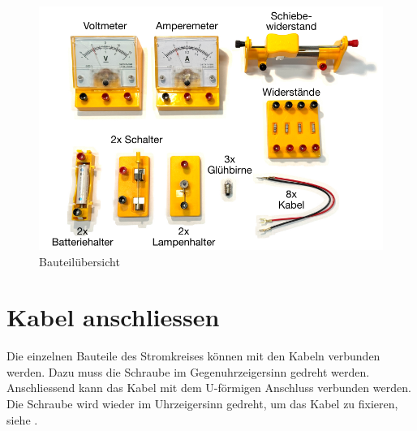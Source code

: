 \begin{figure}[h!]
    \centering
    \includegraphics[width=12cm]{_images/bauteile.pdf}
    \caption{Bauteilübersicht}
    \label{fig:components}
\end{figure}


\section{Kabel anschliessen}

Die einzelnen Bauteile des Stromkreises können mit den Kabeln verbunden werden.
Dazu muss die Schraube im Gegenuhrzeigersinn gedreht werden. Anschliessend kann
das Kabel mit dem U-förmigen Anschluss verbunden werden. Die Schraube wird
wieder im Uhrzeigersinn gedreht, um das Kabel zu fixieren, siehe .

